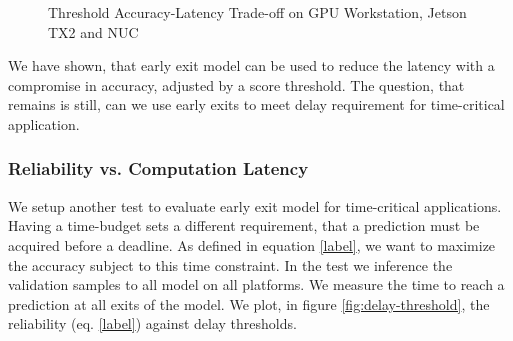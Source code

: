 \begin{figure}
	\caption[Threshold Accuracy-Latency Trade-off]{Threshold Accuracy-Latency Trade-off on \protect{} GPU Workstation, \protect{} Jetson TX2 and \protect{} NUC }
	\label{fig:threshold-acc-lat-trade-off-by-time}
\end{figure}

We have shown, that early exit model can be used to reduce the latency with a compromise in accuracy, adjusted by a score threshold. The question, that remains is still, can we use early exits to meet delay requirement for time-critical application. 

\subsubsection{Reliability vs. Computation Latency}

We setup another test to evaluate early exit model for time-critical applications. Having a time-budget sets a different requirement, that a prediction must be acquired before a deadline. As defined in equation \ref{label}, we want to maximize the accuracy subject to this time constraint. In the test we inference the validation samples to all model on all platforms. We measure the time to reach a prediction at all exits of the model. We plot, in figure \ref{fig:delay-threshold}, the reliability (eq. \ref{label}) against delay thresholds.

